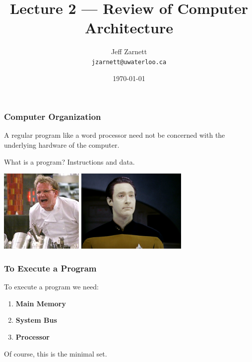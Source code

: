 

\title{Lecture 2 --- Review of Computer Architecture}

\author{Jeff Zarnett \\ \small \texttt{jzarnett@uwaterloo.ca}}
\date{\today}




\begin{frame}
  \titlepage

 \end{frame}

\begin{frame}
\frametitle{Computer Organization}

A regular program like a word processor need not be concerned with the underlying hardware of the computer.

What is a program? Instructions and data.
\begin{center}
	\includegraphics[width=0.3\textwidth]{images/instructions.jpg}
	\includegraphics[width=0.4\textwidth]{images/data.jpg}
\end{center}


\end{frame}

\begin{frame}
\frametitle{To Execute a Program}

To execute a program we need:

\begin{enumerate}
	\item \textbf{Main Memory}
	\item \textbf{System Bus}
	\item \textbf{Processor}
\end{enumerate}

Of course, this is the minimal set.

\end{frame}

